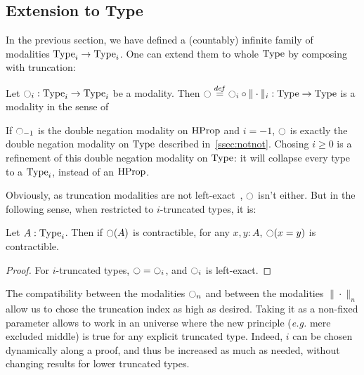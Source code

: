 \subsection{Extension to Type}
\label{ssec:extension-type}

In the previous section, we have defined a (countably) infinite family of
modalities $\operatorname{Type}_i \to \operatorname{Type}_i$. One can extend them to whole
$\operatorname{Type}$ by composing with truncation:

\begin{lem}\label{lem:type}
  Let $\ocircle_i:\operatorname{Type}_i \to \operatorname{Type}_i$ be a modality. Then $\ocircle
  \overset{de\hspace{-0.2ex}f}{=} \ocircle_i
  \circ \|\cdot\|_i : \operatorname{Type} \to \operatorname{Type}$ is a modality in the sense
  of~\cite[Section 7.7]{hottbook}
\end{lem}

If $\ocircle_{-1}$ is the double negation modality on $\operatorname{HProp}$ and
$i=-1$, $\ocircle$ is exactly the double negation modality on $\operatorname{Type}$
described in~\ref{ssec:notnot}.
Chosing $i\geqslant 0$ is a refinement of this double negation
modality on $\operatorname{Type}$: it will collapse every type to a $\operatorname{Type}_i$,
instead of an $\operatorname{HProp}$.

Obviously, as truncation modalities are not left-exact~\cite[Exercise
7.11]{hottbook}, $\ocircle$ isn't either. But in the following sense, when
restricted to $i$-truncated types, it is:
\begin{lem}
  Let $A:\operatorname{Type}_i$. Then if $\ocircle(A)$ is contractible, for any $x,y:A$,
  $\ocircle(x=y)$ is contractible.
\end{lem}
\begin{proof}
  For $i$-truncated types, $\ocircle = \ocircle_i$, and $\ocircle_i$ is left-exact.
\end{proof}

The compatibility between the modalities $\ocircle_n$ and between the
modalities $\|\cdot \|_n$ allow us to chose the truncation index as
high as desired.
Taking it as a non-fixed parameter allows to work in an
universe where the new principle ({\em e.g.} mere excluded middle) is
true for any explicit truncated type. Indeed, $i$ can be chosen
dynamically along a proof, and thus be increased as much as needed,
without changing results for lower truncated types.

